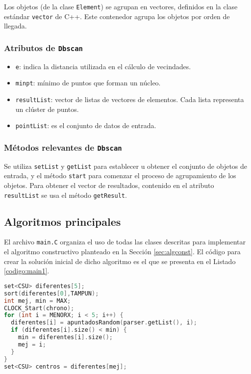 Los objetos (de la clase \texttt{Element}) se agrupan en vectores, definidos en
la clase estándar \texttt{vector} de C++. 
Este contenedor agrupa los objetos por orden de llegada. 

\subsubsection{Atributos de \texttt{Dbscan}}
\begin{itemize}
\item \texttt{e}: indica la distancia utilizada en el cálculo de vecindades.
\item \texttt{minpt}: mínimo de puntos que forman un núcleo.
\item \texttt{resultList}: vector de listas de vectores de elementos. Cada lista
representa un clúster de puntos.
\item \texttt{pointList}: es el conjunto de datos de entrada.
\end{itemize}
\subsubsection{Métodos relevantes de \texttt{Dbscan}}
Se utiliza \texttt{setList} y \texttt{getList} para establecer u obtener el
conjunto de objetos de entrada, y el método \texttt{start} para comenzar el
proceso de agrupamiento de los objetos. Para obtener el vector de resultados,
contenido en el atributo \texttt{resultList} se usa el método
\texttt{getResult}.
\subsection{Algoritmos principales}

El archivo \texttt{main.C} organiza el uso de todas las clases descritas para
implementar el algoritmo constructivo planteado en la Sección
\ref{sec:algconst}. El código para crear la solución inicial de dicho algoritmo
es el que se presenta en el Listado \ref{codigo:main1}.

\begin{lstlisting}[float=tpb,
                   language=C++, numbers=none,
                   caption={Primera fase del algoritmo constructivo: generar la solución inicial},
                   label={codigo:main1}]
set<CSU> diferentes[5];
sort(diferentes[0],TAMPUN);
int mej, min = MAX;
CLOCK_Start(chrono);
for (int i = MENORX; i < 5; i++) {
  diferentes[i] = apuntadosRandom(parser.getList(), i);
  if (diferentes[i].size() < min) {
    min = diferentes[i].size();
    mej = i;
  }
}
set<CSU> centros = diferentes[mej];
\end{lstlisting}

